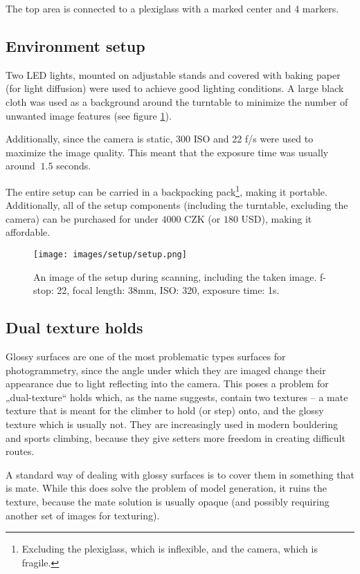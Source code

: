 The top area is connected to a plexiglass with a marked center and 4 markers.

\subsection{Environment setup}
Two LED lights, mounted on adjustable stands and covered with baking paper (for light diffusion) were used to achieve good lighting conditions.
A large black cloth was used as a background around the turntable to minimize the number of unwanted image features (see figure \ref{fig:setup}).

Additionally, since the camera is static, 300 ISO and 22 f/s were used to maximize the image quality.
This meant that the exposure time was usually around $~1.5$ seconds.

The entire setup can be carried in a backpacking pack\footnote{Excluding the plexiglass, which is inflexible, and the camera, which is fragile.}, making it portable.
Additionally, all of the setup components (including the turntable, excluding the camera) can be purchased for under $4000$ CZK (or $180$ USD), making it affordable.

\begin{figure}
	\centering
	\texttt{[image: images/setup/setup.png]}
	\caption{An image of the setup during scanning, including the taken image. f-stop: 22, focal length: 38mm, ISO: 320, exposure time: 1s.}
	  
	\label{fig:setup}
\end{figure}

\subsection{Dual texture holds}
Glossy surfaces are one of the most problematic types surfaces for photogrammetry, since the angle under which they are imaged change their appearance due to light reflecting into the camera.
This poses a problem for „dual-texture“ holds which, as the name suggests, contain two textures -- a mate texture that is meant for the climber to hold (or step) onto, and the glossy texture which is usually not.
They are increasingly used in modern bouldering and sports climbing, because they give setters more freedom in creating difficult routes.

A standard way of dealing with glossy surfaces is to cover them in something that is mate.
While this does solve the problem of model generation, it ruins the texture, because the mate solution is usually opaque (and possibly requiring another set of images for texturing).

